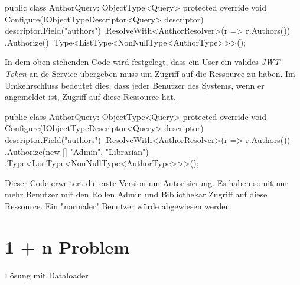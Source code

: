\begin{JsCode}
public class AuthorQuery: ObjectType<Query> {
    protected override void Configure(IObjectTypeDescriptor<Query> descriptor) {
        descriptor.Field("authors")
            .ResolveWith<AuthorResolver>(r => r.Authors())
            .Authorize()
            .Type<ListType<NonNullType<AuthorType>>>();
    }
}
\end{JsCode}

In dem oben stehenden Code wird festgelegt, dass ein User ein valides \textit{JWT-Token} an de Service übergeben muss um Zugriff auf die Ressource zu haben.
Im Umkehrschluss bedeutet dies, dass jeder Benutzer des Systems, wenn er angemeldet ist, Zugriff auf diese Ressource hat.
\newline

\begin{JsCode}
public class AuthorQuery: ObjectType<Query> {
    protected override void Configure(IObjectTypeDescriptor<Query> descriptor) {
        descriptor.Field("authors")
            .ResolveWith<AuthorResolver>(r => r.Authors())
            .Authorize(new [] {"Admin", "Librarian"})
            .Type<ListType<NonNullType<AuthorType>>>();
    }
}
\end{JsCode}
Dieser Code erweitert die erste Version um Autorisierung.
Es haben somit nur mehr Benutzer mit den Rollen Admin und Bibliothekar Zugriff auf diese Ressource.
Ein "normaler" Benutzer würde abgewiesen werden.

\section{1 + n Problem}
Lösung mit Dataloader


